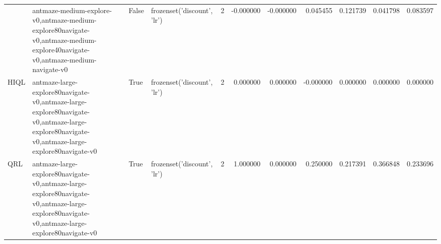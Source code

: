 \begin{tabular}{llllrrrrrrr}
\cline{2-11} \cline{3-11}
 & antmaze-medium-explore-v0,antmaze-medium-explore80navigate-v0,antmaze-medium-explore40navigate-v0,antmaze-medium-navigate-v0 & False & frozenset({'discount', 'lr'}) & 2 & -0.000000 & -0.000000 & 0.045455 & 0.121739 & 0.041798 & 0.083597 \\
\cline{1-11} \cline{2-11} \cline{3-11}
HIQL & antmaze-large-explore80navigate-v0,antmaze-large-explore80navigate-v0,antmaze-large-explore80navigate-v0,antmaze-large-explore80navigate-v0 & True & frozenset({'discount', 'lr'}) & 2 & 0.000000 & 0.000000 & -0.000000 & 0.000000 & 0.000000 & 0.000000 \\
\cline{1-11} \cline{2-11} \cline{3-11}
QRL & antmaze-large-explore80navigate-v0,antmaze-large-explore80navigate-v0,antmaze-large-explore80navigate-v0,antmaze-large-explore80navigate-v0 & True & frozenset({'discount', 'lr'}) & 2 & 1.000000 & 0.000000 & 0.250000 & 0.217391 & 0.366848 & 0.233696 \\
\cline{1-11} \cline{2-11} \cline{3-11}
\bottomrule
\end{tabular}
